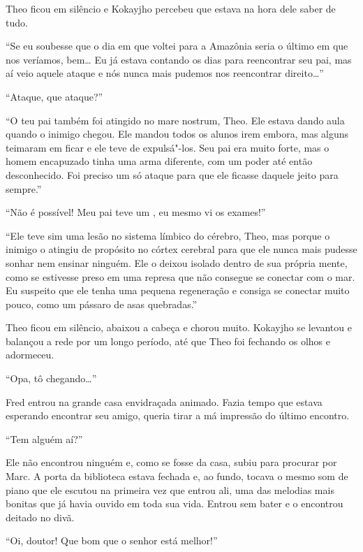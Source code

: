 Theo ficou em silêncio e Kokayjho percebeu que estava na hora dele saber
de tudo.

``Se eu soubesse que o dia em que voltei para a Amazônia seria o último em
que nos veríamos, bem\ldots{} Eu já estava contando os dias para
reencontrar seu pai, mas aí veio aquele ataque e nós nunca mais pudemos
nos reencontrar direito\ldots{}''

``Ataque, que ataque?''

``O teu pai também foi atingido no mare nostrum, Theo. Ele estava dando
aula quando o inimigo chegou. Ele mandou todos os alunos irem embora, mas
alguns teimaram em ficar e ele teve de expulsá"-los. Seu pai era muito
forte, mas o homem encapuzado tinha uma arma diferente, com um poder até
então desconhecido. Foi preciso um só ataque para que ele ficasse
daquele jeito para sempre.''

``Não é possível! Meu pai teve um , eu mesmo vi os exames!''

``Ele teve sim uma lesão no sistema límbico do cérebro, Theo, mas porque
o inimigo o atingiu de propósito no córtex cerebral para que ele nunca
mais pudesse sonhar nem ensinar ninguém. Ele o deixou isolado dentro de
sua própria mente, como se estivesse preso em uma represa que não
consegue se conectar com o mar. Eu suspeito que ele tenha uma pequena
regeneração e consiga se conectar muito pouco, como um pássaro de asas
quebradas.''

Theo ficou em silêncio, abaixou a cabeça e chorou muito. Kokayjho se
levantou e balançou a rede por um longo período, até que Theo foi fechando os
olhos e adormeceu.

\asterisc


``Opa, tô chegando\ldots{}''

Fred entrou na grande casa envidraçada animado. Fazia tempo que estava
esperando encontrar seu amigo, queria tirar a má impressão do último
encontro.

``Tem alguém aí?''

Ele não encontrou ninguém e, como se fosse da casa, subiu para procurar
por Marc. A porta da biblioteca estava fechada e, ao fundo, tocava o
mesmo som de piano que ele escutou na primeira vez que entrou ali, uma
das melodias mais bonitas que já havia ouvido em toda sua vida. Entrou
sem bater e o encontrou deitado no divã.

``Oi, doutor! Que bom que o senhor está melhor!''

